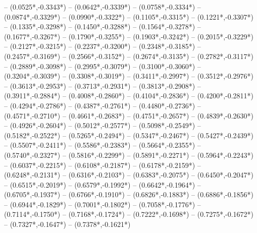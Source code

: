 {	-- ({0.0525*\dx},{-0.3343*\dy})
	-- ({0.0642*\dx},{-0.3339*\dy})
	-- ({0.0758*\dx},{-0.3334*\dy})
	-- ({0.0874*\dx},{-0.3329*\dy})
	-- ({0.0990*\dx},{-0.3322*\dy})
	-- ({0.1105*\dx},{-0.3315*\dy})
	-- ({0.1221*\dx},{-0.3307*\dy})
	-- ({0.1335*\dx},{-0.3298*\dy})
	-- ({0.1450*\dx},{-0.3288*\dy})
	-- ({0.1564*\dx},{-0.3278*\dy})
	-- ({0.1677*\dx},{-0.3267*\dy})
	-- ({0.1790*\dx},{-0.3255*\dy})
	-- ({0.1903*\dx},{-0.3242*\dy})
	-- ({0.2015*\dx},{-0.3229*\dy})
	-- ({0.2127*\dx},{-0.3215*\dy})
	-- ({0.2237*\dx},{-0.3200*\dy})
	-- ({0.2348*\dx},{-0.3185*\dy})
	-- ({0.2457*\dx},{-0.3169*\dy})
	-- ({0.2566*\dx},{-0.3152*\dy})
	-- ({0.2674*\dx},{-0.3135*\dy})
	-- ({0.2782*\dx},{-0.3117*\dy})
	-- ({0.2889*\dx},{-0.3098*\dy})
	-- ({0.2995*\dx},{-0.3079*\dy})
	-- ({0.3100*\dx},{-0.3060*\dy})
	-- ({0.3204*\dx},{-0.3039*\dy})
	-- ({0.3308*\dx},{-0.3019*\dy})
	-- ({0.3411*\dx},{-0.2997*\dy})
	-- ({0.3512*\dx},{-0.2976*\dy})
	-- ({0.3613*\dx},{-0.2953*\dy})
	-- ({0.3713*\dx},{-0.2931*\dy})
	-- ({0.3813*\dx},{-0.2908*\dy})
	-- ({0.3911*\dx},{-0.2884*\dy})
	-- ({0.4008*\dx},{-0.2860*\dy})
	-- ({0.4104*\dx},{-0.2836*\dy})
	-- ({0.4200*\dx},{-0.2811*\dy})
	-- ({0.4294*\dx},{-0.2786*\dy})
	-- ({0.4387*\dx},{-0.2761*\dy})
	-- ({0.4480*\dx},{-0.2736*\dy})
	-- ({0.4571*\dx},{-0.2710*\dy})
	-- ({0.4661*\dx},{-0.2683*\dy})
	-- ({0.4751*\dx},{-0.2657*\dy})
	-- ({0.4839*\dx},{-0.2630*\dy})
	-- ({0.4926*\dx},{-0.2604*\dy})
	-- ({0.5012*\dx},{-0.2577*\dy})
	-- ({0.5098*\dx},{-0.2549*\dy})
	-- ({0.5182*\dx},{-0.2522*\dy})
	-- ({0.5265*\dx},{-0.2494*\dy})
	-- ({0.5347*\dx},{-0.2467*\dy})
	-- ({0.5427*\dx},{-0.2439*\dy})
	-- ({0.5507*\dx},{-0.2411*\dy})
	-- ({0.5586*\dx},{-0.2383*\dy})
	-- ({0.5664*\dx},{-0.2355*\dy})
	-- ({0.5740*\dx},{-0.2327*\dy})
	-- ({0.5816*\dx},{-0.2299*\dy})
	-- ({0.5891*\dx},{-0.2271*\dy})
	-- ({0.5964*\dx},{-0.2243*\dy})
	-- ({0.6037*\dx},{-0.2215*\dy})
	-- ({0.6108*\dx},{-0.2187*\dy})
	-- ({0.6178*\dx},{-0.2159*\dy})
	-- ({0.6248*\dx},{-0.2131*\dy})
	-- ({0.6316*\dx},{-0.2103*\dy})
	-- ({0.6383*\dx},{-0.2075*\dy})
	-- ({0.6450*\dx},{-0.2047*\dy})
	-- ({0.6515*\dx},{-0.2019*\dy})
	-- ({0.6579*\dx},{-0.1992*\dy})
	-- ({0.6642*\dx},{-0.1964*\dy})
	-- ({0.6705*\dx},{-0.1937*\dy})
	-- ({0.6766*\dx},{-0.1910*\dy})
	-- ({0.6826*\dx},{-0.1883*\dy})
	-- ({0.6886*\dx},{-0.1856*\dy})
	-- ({0.6944*\dx},{-0.1829*\dy})
	-- ({0.7001*\dx},{-0.1802*\dy})
	-- ({0.7058*\dx},{-0.1776*\dy})
	-- ({0.7114*\dx},{-0.1750*\dy})
	-- ({0.7168*\dx},{-0.1724*\dy})
	-- ({0.7222*\dx},{-0.1698*\dy})
	-- ({0.7275*\dx},{-0.1672*\dy})
	-- ({0.7327*\dx},{-0.1647*\dy})
	-- ({0.7378*\dx},{-0.1621*\dy})
}

